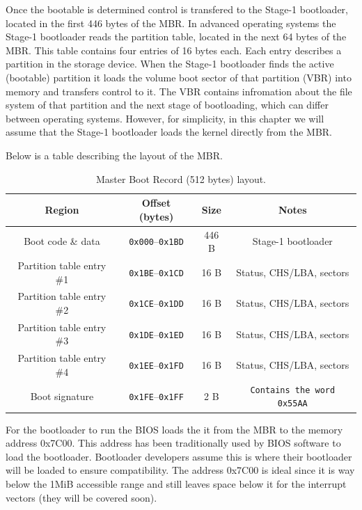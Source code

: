 Once the bootable is determined control is transfered to the Stage-1 bootloader, located in the first 446 bytes of the MBR.
In advanced operating systems the Stage-1 bootloader reads the partition table, located in the next 64 bytes of the MBR.
This table contains four entries of 16 bytes each. Each entry describes a partition in the storage device. When the Stage-1
bootloader finds the active (bootable) partition it loads the volume boot sector of that partition (VBR) into memory and transfers
control to it. The VBR contains infromation about the file system of that partition and the next stage of bootloading, which can differ
between operating systems. However, for simplicity, in this chapter we will assume that the Stage-1 bootloader loads the kernel directly 
from the MBR.

Below is a table describing the layout of the MBR.

\begin{table}[h]
    \centering
    \renewcommand{\arraystretch}{1.15}
    \begin{tabular}{|c|c|c|c|}
    \hline
    \textbf{Region} & \textbf{Offset (bytes)} & \textbf{Size} & \textbf{Notes} \\
    \hline
    Boot code \& data & \texttt{0x000}–\texttt{0x1BD} & 446 B & Stage-1 bootloader \\
    \hline
    Partition table entry \#1 & \texttt{0x1BE}–\texttt{0x1CD} & 16 B & Status, CHS/LBA, sectors \\
    \hline
    Partition table entry \#2 & \texttt{0x1CE}–\texttt{0x1DD} & 16 B & Status, CHS/LBA, sectors \\
    \hline
    Partition table entry \#3 & \texttt{0x1DE}–\texttt{0x1ED} & 16 B & Status, CHS/LBA, sectors \\
    \hline
    Partition table entry \#4 & \texttt{0x1EE}–\texttt{0x1FD} & 16 B & Status, CHS/LBA, sectors \\
    \hline
    Boot signature & \texttt{0x1FE}–\texttt{0x1FF} & 2 B & \texttt{Contains the word 0x55AA} \\
    \hline
    \end{tabular}
    \caption{Master Boot Record (512 bytes) layout.}
\end{table}
    
For the bootloader to run the BIOS loads the it from the MBR to the memory address 0x7C00. This address has been
traditionally used by BIOS software to load the bootloader. Bootloader developers assume this is where their 
bootloader will be loaded to ensure compatibility. The address 0x7C00 is ideal since it is way below the 1MiB 
accessible range and still leaves space below it for the interrupt vectors (they will be covered soon).

